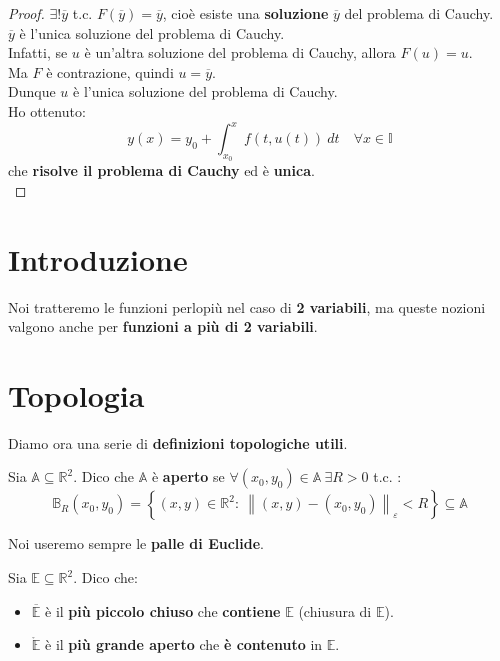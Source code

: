 \documentclass[a4paper, oneside]{article}
\newcommand\R{\mathbb{R}}
\newcommand\B{\mathbb{B}}
\newcommand\A{\mathbb{A}}
\newcommand\I{\mathbb{I}}
\newcommand\E{\mathbb{E}}
\begin{document}
\begin{theorem}
\begin{proof}
        \newpage
        \noindent $\exists!\overline{y}$ t.c. $F(\overline{y}) = \overline{y}$, cioè esiste una \textbf{soluzione} $\overline{y}$ del problema di Cauchy.\\
         $\overline{y}$ è l'unica soluzione del problema di Cauchy.\\
         Infatti, se $u$ è un'altra soluzione del problema di Cauchy, allora $F(u) = u$.\\
         Ma $F$ è contrazione, quindi $u = \overline{y}$.\\
         Dunque $u$ è l'unica soluzione del problema di Cauchy.\\
          Ho ottenuto:
        \[y(x) = y_0 + \int_{x_0}^{x} f\left(t,u(t)\right) \ dt \quad\forall x\in\I\]
        che \textbf{risolve il problema di Cauchy} ed è \textbf{unica}.\\
    \end{proof}
\end{theorem}
    \newpage

    \section{Introduzione}
    Noi tratteremo le funzioni perlopiù nel caso di \textbf{2 variabili}, ma queste nozioni valgono 
    anche per \textbf{funzioni a più di 2 variabili}.

    \section{Topologia}
    Diamo ora una serie di \textbf{definizioni topologiche utili}.

    \begin{definition}
        Sia $\A\subseteq\R^2$. Dico che $\A$ è \textbf{aperto} se $\forall (x_0,y_0)\in\A \ \exists R>0$ t.c. :
        \[\B_R(x_0,y_0) = \left\{(x,y)\in\R^2: \ \left\lVert (x,y) - (x_0,y_0)\right\rVert_\varepsilon < R \right\} \subseteq \A\]
    \end{definition}
    \noindent Noi useremo sempre le \textbf{palle di Euclide}.

    \begin{definition}
        Sia $\E\subseteq\R^2$. Dico che:
        \begin{itemize}
            \item $\overline{\E}$ è il \textbf{più piccolo chiuso} che \textbf{contiene} $\E$ (chiusura di $\E$).
            \item $\mathring{\E}$ è il \textbf{più grande aperto} che \textbf{è contenuto} in $\E$. 
        \end{itemize}
    \end{definition}
\end{document}
